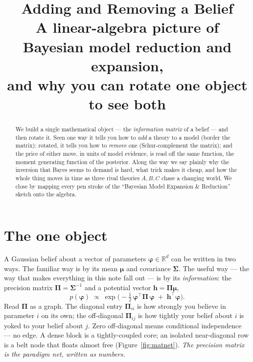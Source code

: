 \documentclass[11pt]{article}
\title{\textbf{Adding and Removing a Belief}\\[2pt]
\large A linear-algebra picture of Bayesian model reduction and expansion,\\
and why you can rotate one object to see both}
\author{}
\date{}
\newcommand{\R}{\mathbb{R}}
\newcommand{\Prec}{\bm{\Pi}}        %
\newcommand{\Cov}{\bm{\Sigma}}
\newcommand{\hvec}{\bm{h}}          %
\newcommand{\fvec}{\bm{\varphi}}    %
\theoremstyle{definition}
\begin{document}
\maketitle

\begin{abstract}
\noindent We build a single mathematical object --- the \emph{information
matrix} of a belief --- and then rotate it. Seen one way it tells you how
to \emph{add} a theory to a model (border the matrix); rotated, it tells
you how to \emph{remove} one (Schur-complement the matrix); and the price
of either move, in units of model evidence, is read off the same
function, the moment generating function of the posterior. Along the way
we say plainly why the inversion that Bayes seems to demand is hard, what
trick makes it cheap, and how the whole thing moves in time as three rival
theories $A,B,C$ chase a changing world. We close by mapping every pen
stroke of the ``Bayesian Model Expansion \& Reduction'' sketch onto the
algebra.
\end{abstract}

\section{The one object}

A Gaussian belief about a vector of parameters $\fvec\in\R^d$ can be
written in two ways. The familiar way is by its mean $\bm\mu$ and
covariance $\Cov$. The useful way --- the way that makes everything in
this note fall out --- is by its \emph{information}: the precision matrix
$\Prec=\Cov^{-1}$ and a potential vector $\hvec=\Prec\bm\mu$,
\begin{equation}
p(\fvec)\;\propto\;
\exp\!\Big(-\tfrac12\,\fvec^{\top}\Prec\,\fvec \;+\; \hvec^{\top}\fvec\Big).
\label{eq:canon}
\end{equation}
Read $\Prec$ as a graph. The diagonal entry $\Prec_{ii}$ is how strongly
you believe in parameter $i$ on its own; the off-diagonal $\Prec_{ij}$ is
how tightly your belief about $i$ is yoked to your belief about $j$. Zero
off-diagonal means conditional independence --- no edge. A dense block is
a tightly-coupled core; an isolated near-diagonal row is a belt node that
floats almost free (Figure~\ref{fig:matnet}). \emph{The precision matrix
is the paradigm net, written as numbers.}
\end{document}
